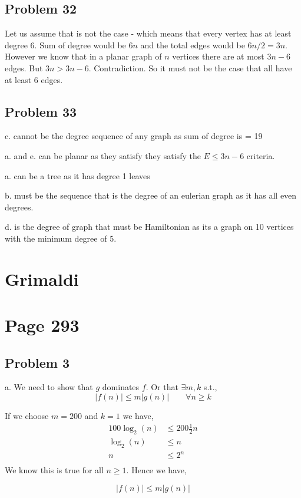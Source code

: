 \documentclass[a4paper]{report}
\begin{document}
\subsection*{Problem 32}
Let us assume that is not the case - which means that every vertex has at least degree 6. Sum of degree would be $6n$ and the total edges would be  $6n /2 = 3n$. However we know that in a planar graph  of  $n$ vertices there are at most $3n - 6$ edges. But  $3n > 3n - 6$. Contradiction. So it must not be the case that all have at least 6 edges.

\subsection*{Problem 33}
c. cannot be the degree sequence of any graph as sum of degree is = 19

a. and e. can be planar as they satisfy they satisfy the $E \le 3n - 6$ criteria.

a. can be a tree as it has degree 1 leaves

b. must be the sequence that is the degree of an eulerian graph as it has all even degrees.

d. is the degree of graph that must be Hamiltonian as its a graph on 10 vertices with the minimum degree of 5.
\section*{Grimaldi}

\section*{Page 293}
\subsection*{Problem 3}
a. We need to show that $g$ dominates $f$. Or that $\exists m, k$ s.t., 
$$ |f(n)| \le m |g(n)| \qquad{\forall n \ge k}$$ 

If we choose $m = 200$ and  $k = 1$ we have,
\begin{align*}
    100 \log_2 (n) &\le 200 \frac{1}{2}  n\\
     \log_2 (n) &\le   n\\
     n &\le   2^{n}\\
\end{align*}
We know this is true for all $n \ge 1$. Hence we have, 

$$ |f(n)| \le m |g(n)| $$
\end{document}

